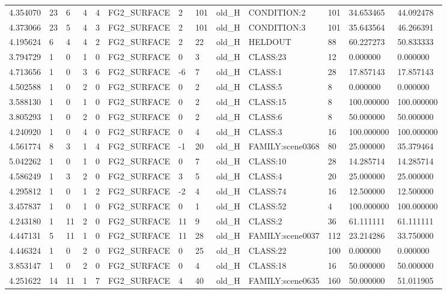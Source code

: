 \begin{tabular}{lllllllllllll}
4.354070 & 23 & 6 & 4 & 4 & FG2\_SURFACE & 2 & 101 & old\_H & CONDITION:2 & 101 & 34.653465 & 44.092478 \\
4.373066 & 23 & 5 & 4 & 3 & FG2\_SURFACE & 2 & 101 & old\_H & CONDITION:3 & 101 & 35.643564 & 46.266391 \\
4.195624 & 6 & 4 & 4 & 2 & FG2\_SURFACE & 2 & 22 & old\_H & HELDOUT & 88 & 60.227273 & 50.833333 \\
3.794729 & 1 & 0 & 1 & 0 & FG2\_SURFACE & 0 & 3 & old\_H & CLASS:23 & 12 & 0.000000 & 0.000000 \\
4.713656 & 1 & 0 & 3 & 6 & FG2\_SURFACE & -6 & 7 & old\_H & CLASS:1 & 28 & 17.857143 & 17.857143 \\
4.502588 & 1 & 0 & 2 & 0 & FG2\_SURFACE & 0 & 2 & old\_H & CLASS:5 & 8 & 0.000000 & 0.000000 \\
3.588130 & 1 & 0 & 1 & 0 & FG2\_SURFACE & 0 & 2 & old\_H & CLASS:15 & 8 & 100.000000 & 100.000000 \\
3.805293 & 1 & 0 & 2 & 0 & FG2\_SURFACE & 0 & 2 & old\_H & CLASS:6 & 8 & 50.000000 & 50.000000 \\
4.240920 & 1 & 0 & 4 & 0 & FG2\_SURFACE & 0 & 4 & old\_H & CLASS:3 & 16 & 100.000000 & 100.000000 \\
4.561774 & 8 & 3 & 1 & 4 & FG2\_SURFACE & -1 & 20 & old\_H & FAMILY:scene0368 & 80 & 25.000000 & 35.379464 \\
5.042262 & 1 & 0 & 1 & 0 & FG2\_SURFACE & 0 & 7 & old\_H & CLASS:10 & 28 & 14.285714 & 14.285714 \\
4.586249 & 1 & 3 & 2 & 0 & FG2\_SURFACE & 3 & 5 & old\_H & CLASS:4 & 20 & 25.000000 & 25.000000 \\
4.295812 & 1 & 0 & 1 & 2 & FG2\_SURFACE & -2 & 4 & old\_H & CLASS:74 & 16 & 12.500000 & 12.500000 \\
3.457837 & 1 & 0 & 1 & 0 & FG2\_SURFACE & 0 & 1 & old\_H & CLASS:52 & 4 & 100.000000 & 100.000000 \\
4.243180 & 1 & 11 & 2 & 0 & FG2\_SURFACE & 11 & 9 & old\_H & CLASS:2 & 36 & 61.111111 & 61.111111 \\
4.447131 & 5 & 11 & 1 & 0 & FG2\_SURFACE & 11 & 28 & old\_H & FAMILY:scene0037 & 112 & 23.214286 & 33.750000 \\
4.446324 & 1 & 0 & 2 & 0 & FG2\_SURFACE & 0 & 25 & old\_H & CLASS:22 & 100 & 0.000000 & 0.000000 \\
3.853147 & 1 & 0 & 2 & 0 & FG2\_SURFACE & 0 & 4 & old\_H & CLASS:18 & 16 & 50.000000 & 50.000000 \\
4.251622 & 14 & 11 & 1 & 7 & FG2\_SURFACE & 4 & 40 & old\_H & FAMILY:scene0635 & 160 & 50.000000 & 51.011905 \\

\end{tabular}
